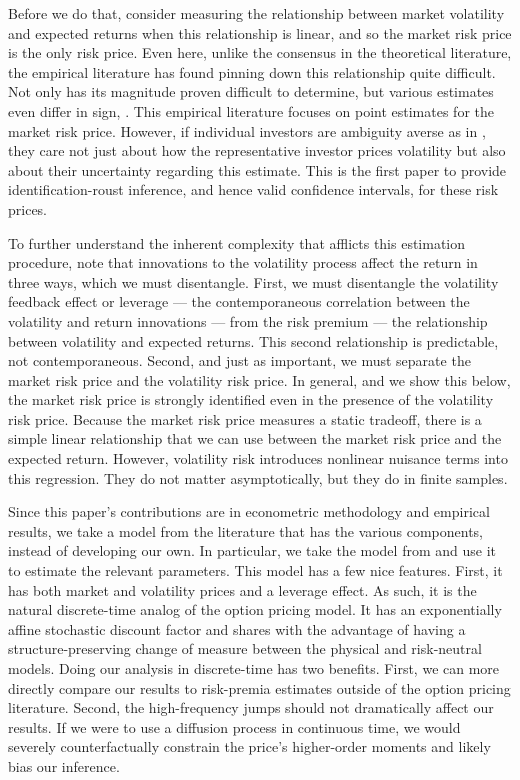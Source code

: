 \documentclass[11pt, letterpaper, twoside]{article}
\begin{document}
Before we do that, consider measuring the relationship between market volatility and expected returns when this relationship is linear, and so the market risk price is the only risk price. Even here, unlike the consensus in the theoretical literature, the empirical literature has found pinning down this relationship quite difficult. Not only has its magnitude proven difficult to determine, but various estimates even differ in sign, \parencites{brandt2004relationship, lettau2010measuring}. This empirical literature focuses on point estimates for the market risk price. However, if individual investors are ambiguity averse as in \textcite{hansen2001robust, jiu2012ambiguity}, they care not just about how the representative investor prices volatility but also about their uncertainty regarding this estimate. This is the first paper to provide identification-roust inference, and hence valid confidence intervals, for these risk prices. 

To further understand the inherent complexity that afflicts this estimation procedure, note that innovations to the volatility process affect the return in three ways, which we must disentangle. First, we must disentangle the volatility feedback effect or leverage --- the contemporaneous correlation between the volatility and return innovations --- from the risk premium --- the relationship between volatility and expected returns. This second relationship is predictable, not contemporaneous. Second, and just as important, we must separate the market risk price and the volatility risk price. In general, and we show this below, the market risk price is strongly identified even in the presence of the volatility risk price. Because the market risk price measures a static tradeoff, there is a simple linear relationship that we can use between the market risk price and the expected return. However, volatility risk introduces nonlinear nuisance terms into this regression. They do not matter asymptotically, but they do in finite samples.

Since this paper's contributions are in econometric methodology and empirical results, we take a model from the literature that has the various components, instead of developing our own. In particular, we take the model from \textcite{han2018leverage} and use it to estimate the relevant parameters. This model has a few nice features. First, it has both market and volatility prices and a leverage effect. As such, it is the natural discrete-time analog of the \textcite{heston1993closedform} option pricing model. It has an exponentially affine stochastic discount factor and shares with \textcite{heston1993closedform} the advantage of having a structure-preserving change of measure between the physical and risk-neutral models. Doing our analysis in discrete-time has two benefits. First, we can more directly compare our results to risk-premia estimates outside of the option pricing literature. Second, the high-frequency jumps should not dramatically affect our results. If we were to use a diffusion process in continuous time, we would severely counterfactually constrain the price's higher-order moments and likely bias our inference. 
\end{document}
